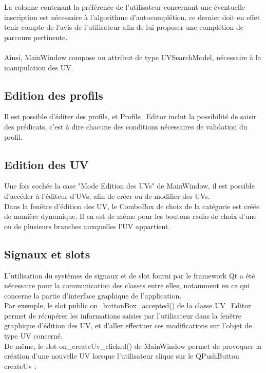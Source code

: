 \documentclass[a4paper,10pt,french]{report}
\begin{document}
	La colonne contenant la préférence de l'utilisateur concernant une éventuelle inscription est nécessaire à l'algorithme d'autocomplétion, ce dernier doit en effet tenir compte de l'avis de l'utilisateur afin de lui proposer une complétion de parcours pertinente.\\\\
    
    Ainsi, MainWindow compose un attribut de type UVSearchModel, nécessaire à la manipulation des UV. %
    
    
	
	
		
	
    \subsection{Edition des profils}\label{subsec:Edition des profils}
        Il est possible d'éditer des profils, et Profile\_Editor inclut la possibilité de saisir des prédicats, c'est à dire chacune des conditions nécessaires de validation du profil.
        
        
	\subsection{Edition des UV}\label{subsec:Edition des UV}
    
		Une fois cochée la case "Mode Edition des UVs" de MainWindow, il est possible d'accéder à l'éditeur d'UVs, afin de créer ou de modifier des UVs.\\
		Dans la fenêtre d'édition des UV, le ComboBox de choix de la catégorie est créée de manière dynamique.
		Il en est de même pour les boutons radio de choix d'une ou de plusieurs branches auxquelles l'UV appartient.
        

    \subsection{Signaux et slots}\label{subsec:signaux et slots}
		L'utilisation du systèmes de signaux et de slot fourni par le framework Qt a été nécessaire pour la communication des classes entre elles, notamment en ce qui concerne la partie d'interface graphique de l'application.\\
        Par exemple, le slot public on\_buttonBox\_accepted() de la classe UV\_Editor permet de récupérer les informations saisies par l'utilisateur dans la fenêtre graphique d'édition des UV, et d'aller effectuer ces modifications sur l'objet de type UV concerné.\\
        De même, le slot on\_createUv\_clicked() de MainWindow permet de provoquer la création d'une nouvelle UV lorsque l'utilisateur clique sur le QPushButton createUv : 
        
\end{document}
